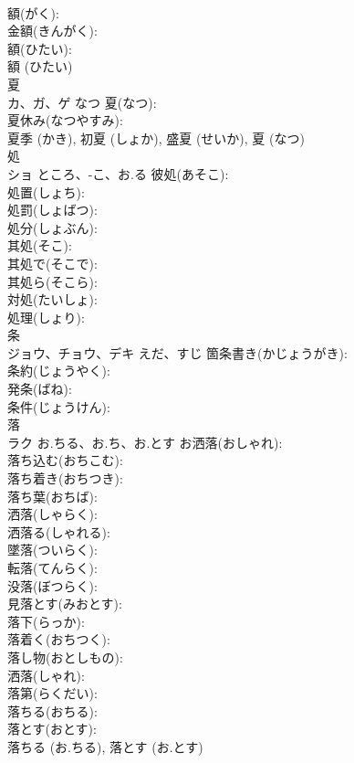 \documentclass[8pt]{extreport}
\begin{document}
\begin{CJK}{UTF8}{min}
\\	額(がく): 
\\	金額(きんがく): 
\\	額(ひたい): 
\\	額 (ひたい)
\\	夏			
\\	カ、ガ、ゲ	なつ	夏(なつ): 
\\	夏休み(なつやすみ): 
\\	夏季 (かき), 初夏 (しょか), 盛夏 (せいか), 夏 (なつ)
\\	処			
\\	ショ	ところ、-こ、お.る	彼処(あそこ): 
\\	処置(しょち): 
\\	処罰(しょばつ): 
\\	処分(しょぶん): 
\\	其処(そこ): 
\\	其処で(そこで): 
\\	其処ら(そこら): 
\\	対処(たいしょ): 
\\	処理(しょり): 
\\	条			
\\	ジョウ、チョウ、デキ	えだ、すじ	箇条書き(かじょうがき): 
\\	条約(じょうやく): 
\\	発条(ばね): 
\\	条件(じょうけん): 
\\	落			
\\	ラク	お.ちる、お.ち、お.とす	お洒落(おしゃれ): 
\\	落ち込む(おちこむ): 
\\	落ち着き(おちつき): 
\\	落ち葉(おちば): 
\\	洒落(しゃらく): 
\\	洒落る(しゃれる): 
\\	墜落(ついらく): 
\\	転落(てんらく): 
\\	没落(ぼつらく): 
\\	見落とす(みおとす): 
\\	落下(らっか): 
\\	落着く(おちつく): 
\\	落し物(おとしもの): 
\\	洒落(しゃれ): 
\\	落第(らくだい): 
\\	落ちる(おちる): 
\\	落とす(おとす): 
\\	落ちる (お.ちる), 落とす (お.とす)

\end{CJK}
\end{document}
